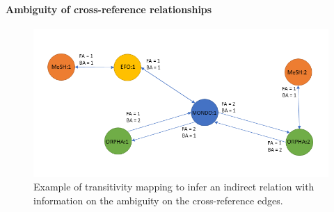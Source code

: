 \documentclass[9pt,a4paper,]{extarticle}
\begin{document}
\hypertarget{ambiguity-of-cross-reference-relationships}{%
\paragraph{Ambiguity of cross-reference relationships}\label{ambiguity-of-cross-reference-relationships}}

\begin{figure}

{\centering \includegraphics[width=1\linewidth]{DODO-F1000-publication_files/figure-latex/Figure3} 

}

\caption{Example of transitivity mapping to infer an indirect relation with information on the ambiguity on the cross-reference edges.}\label{fig:dodobafa}
\end{figure}
\end{document}
